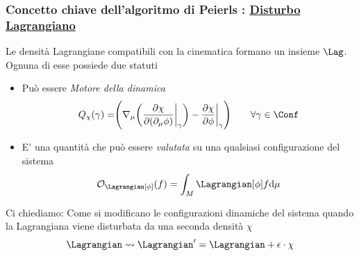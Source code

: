 \documentclass[8pt,handout]{beamer}
\begin{document}
	\begin{frame}
		\frametitle{ Concetto chiave dell'algoritmo di Peierls : \underline{Disturbo Lagrangiano}}
			Le densità Lagrangiane compatibili con la cinematica formano un insieme $\Lag$.\\
			Ognuna di esse possiede due statuti
			\begin{itemize}
				\item Può essere \emph{Motore della dinamica} 
					\begin{displaymath}
						Q_\chi (\gamma) = \Biggr( \nabla_\mu \biggr( \frac{\partial \chi}{\partial(\partial_\mu \phi)} \biggr\vert_\gamma \biggr) - \frac{\partial \chi}{\partial \phi}\biggr\vert_\gamma \Biggr) \qquad \forall \gamma \in \Conf
					\end{displaymath}
				\item E' una quantità che può essere \emph{valutata} su una qualsiasi configurazione del sistema 
					\begin{displaymath}
						\mathcal{O}_\Lagrangian [\phi] (f) = \int_M \Lagrangian [\phi] f \textrm{d}\mu
					\end{displaymath}	
			\end{itemize}
		\vfill
		\begin{exampleblock}{Ci chiediamo:}
			Come si modificano le configurazioni dinamiche del sistema quando la Lagrangiana viene disturbata da una seconda densità  $\chi$
			\begin{displaymath}
				\Lagrangian \rightsquigarrow \Lagrangian' = \Lagrangian + \epsilon\cdot \chi
			\end{displaymath}
		\end{exampleblock}
		\end{frame}
	
\end{document}
